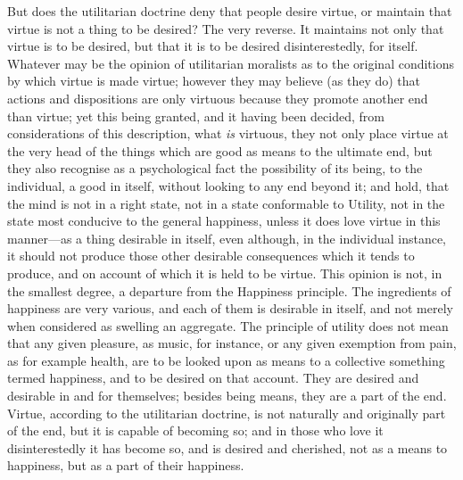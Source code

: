 \documentclass[12pt]{report}
\begin{document}
But does the utilitarian doctrine deny that people desire virtue, or maintain that virtue is not a thing to be desired? The very reverse. It maintains not only that virtue is to be desired, but that it is to be desired disinterestedly, for itself. Whatever may be the opinion of utilitarian moralists as to the original conditions by which virtue is made virtue; however they may believe (as they do) that actions and dispositions are only virtuous because they promote another end than virtue; yet this being granted, and it having been decided, from considerations of this description, what \emph{is} virtuous, they not only place virtue at the very head of the things which are good as means to the ultimate end, but they also recognise as a psychological fact the possibility of its being, to the individual, a good in itself, without looking to any end beyond it; and hold, that the mind is not in a right state, not in a state conformable to Utility, not in the state most conducive to the general happiness, unless it does love virtue in this manner—as a thing desirable in itself, even although, in the individual instance, it should not produce those other desirable consequences which it tends to produce, and on account of which it is held to be virtue. This opinion is not, in the smallest degree, a departure from the Happiness principle. The ingredients of happiness are very various, and each of them is desirable in itself, and not merely when considered as swelling an aggregate. The principle of utility does not mean that any given pleasure, as music, for instance, or any given exemption from pain, as for example health, are to be looked upon as means to a collective something termed happiness, and to be desired on that account. They are desired and desirable in and for themselves; besides being means, they are a part of the end. Virtue, according to the utilitarian doctrine, is not naturally and originally part of the end, but it is capable of becoming so; and in those who love it disinterestedly it has become so, and is desired and cherished, not as a means to happiness, but as a part of their happiness.
\end{document}
